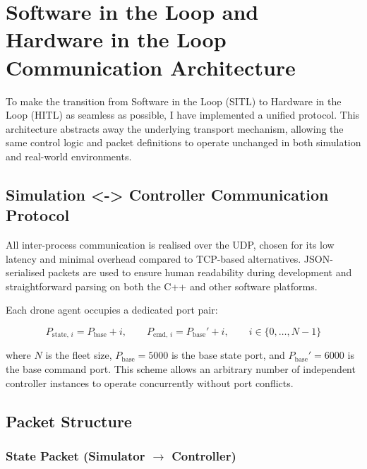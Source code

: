 
\section{Software in the Loop and Hardware in the Loop Communication Architecture}
\label{sec:sitl_hitl}

To make the transition from Software in the Loop (SITL) to Hardware in the Loop (HITL) as seamless as possible, I have implemented a unified protocol. This architecture abstracts away the underlying transport mechanism, allowing the same control logic and packet definitions to operate unchanged in both simulation and real-world environments.


\subsection{Simulation <-> Controller Communication Protocol}
 
All inter-process communication is realised over the UDP, chosen for its low latency and minimal overhead compared to
TCP-based alternatives. JSON-serialised packets are used to ensure human
readability during development and straightforward parsing on both the C++ and
other software platforms.

\vspace{0.5cm}

Each drone agent occupies a dedicated port pair:
 
\begin{equation}
    P_{\text{state},\,i} = P_{\text{base}} + i, \qquad
    P_{\text{cmd},\,i}   = P_{\text{base}}' + i, \qquad i \in \{0,\ldots,N-1\}
\end{equation}
 
\noindent where $N$ is the fleet size, $P_{\text{base}} = 5000$ is the base
state port, and $P_{\text{base}}' = 6000$ is the base command port.
This scheme allows an arbitrary number of independent controller instances to
operate concurrently without port conflicts.
 
\subsection{Packet Structure}
 
\subsubsection{State Packet (Simulator $\rightarrow$ Controller)}
 
